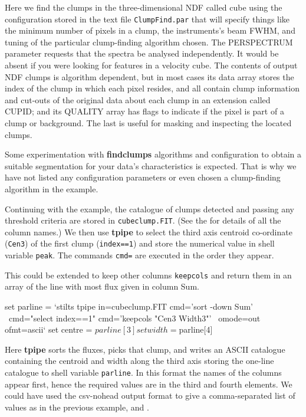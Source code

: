 \documentclass[twoside,11pt]{starlink}
\providecommand{\CUPID}{{\footnotesize CUPID}\normalsize}
\begin{document}
Here we find the clumps in the three-dimensional NDF called cube using
the configuration stored in the text file \texttt{ClumpFind.par} that
will specify things like the minimum number of pixels in a clump, the
instruments's beam FWHM, and tuning of the particular clump-finding
algorithm chosen.  The PERSPECTRUM parameter requests that the spectra
be analysed independently.  It would be absent if you were looking for
features in a velocity cube.  The contents of output NDF clumps is
algorithm dependent, but in most cases its data array stores the index
of the clump in which each pixel resides, and all contain clump
information and cut-outs of the original data about each clump in an
extension called CUPID; and its QUALITY array has flags to indicate if
the pixel is part of a clump or background.  The last is useful for
masking and inspecting the located clumps.

Some experimentation with \textbf{findclumps} algorithms and
configuration to obtain a suitable segmentation for your data's
characteristics is expected.  That is why we have not listed any
configuration parameters or even chosen a clump-finding algorithm in
the example.

Continuing with the example, the catalogue of clumps detected and
passing any threshold criteria are stored in \texttt{cubeclump.FIT}. (See
the \xref{\CUPID\ manual}{sun255}{FINDCLUMPS} for details of all the
column names.) We then use \textbf{tpipe} to select the third axis
centroid co-ordinate (\texttt{Cen3}) of the first clump (\texttt{index==1})
and store the numerical value in shell variable \texttt{peak}.  The
commands \texttt{cmd=} are executed in the order they appear.

This could be extended to keep other columns \texttt{keepcols} and return
them in an array of the line with most flux given in column Sum.

\begin{terminalv}
set parline = `stilts tpipe in=cubeclump.FIT cmd='sort -down Sum' \
             cmd="select index==1" cmd='keepcols "Cen3 Width3"' \
             omode=out ofmt=ascii`
set centre = $parline[3]
set width = $parline[4]
\end{terminalv}

Here \textbf{tpipe} sorts the fluxes, picks that clump, and writes an
ASCII catalogue containing the centroid and width along the third axis
storing the one-line catalogue to shell variable \texttt{parline}.  In
this format the names of the columns appear first, hence the required
values are in the third and fourth elements.  We could have used the
csv-nohead output format to give a comma-separated list of values as
in the previous example, and .
\end{document}
